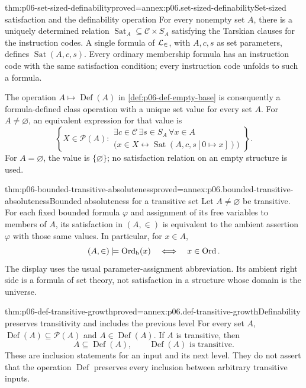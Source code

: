 \begin{hbtheorem}{thm:p06-set-sized-definability}{proved=annex:p06.set-sized-definability}{Set-sized satisfaction and the definability operation}
For every nonempty set \(A\), there is a uniquely determined
relation \(\operatorname{Sat}_A\subseteq\mathcal C\times S_A\)
satisfying the Tarskian clauses for the instruction codes.  A single
formula of \(\mathcal{L}_{\in}\), with \(A,c,s\) as set parameters,
defines \(\operatorname{Sat}(A,c,s)\).  Every ordinary membership
formula has an instruction code with the same satisfaction condition;
every instruction code unfolds to such a formula.

The operation \(A\mapsto\operatorname{Def}(A)\) in
\cref{def:p06-def-empty-base} is consequently a formula-defined
class operation with a unique set value for every set \(A\).
For \(A\ne\varnothing\), an equivalent expression for that value is
\[
 \left\{X\in\mathcal{P}(A):
 \begin{gathered}
  \exists c\in\mathcal C\,\exists s\in S_A\,\forall x\in A\\[-2pt]
  \bigl(x\in X\leftrightarrow
       \operatorname{Sat}(A,c,s[0\mapsto x])\bigr)
 \end{gathered}
 \right\}.
\]
For \(A=\varnothing\), the value is \(\{\varnothing\}\);
no satisfaction relation on an empty structure is used.
\end{hbtheorem}

\begin{hbtheorem}{thm:p06-bounded-transitive-absoluteness}{proved=annex:p06.bounded-transitive-absoluteness}{Bounded absoluteness for a transitive set}
Let \(A\ne\varnothing\) be transitive.  For each fixed bounded
formula \(\varphi\) and assignment of its free variables to members
of \(A\), its satisfaction in \((A,\in)\) is equivalent to the
ambient assertion \(\varphi\) with those same values.  In particular,
for \(x\in A\),
\[
 (A,\in)\models\operatorname{Ord}_{\mathrm b}(x)
 \quad\Longleftrightarrow\quad x\in\operatorname{Ord}.
\]
The display uses the usual parameter-assignment abbreviation.  Its
ambient right side is a formula of set theory, not satisfaction in
a structure whose domain is the universe.
\end{hbtheorem}

\begin{hblemma}{thm:p06-def-transitive-growth}{proved=annex:p06.def-transitive-growth}{Definability preserves transitivity and includes the previous level}
For every set \(A\),
\(\operatorname{Def}(A)\subseteq\mathcal{P}(A)\) and
\(A\in\operatorname{Def}(A)\).  If \(A\) is transitive, then
\[
 A\subseteq\operatorname{Def}(A),
 \qquad \operatorname{Def}(A)\text{ is transitive}.
\]
These are inclusion statements for an input and its next level.
They do not assert that the operation \(\operatorname{Def}\)
preserves every inclusion between arbitrary transitive inputs.
\end{hblemma}

